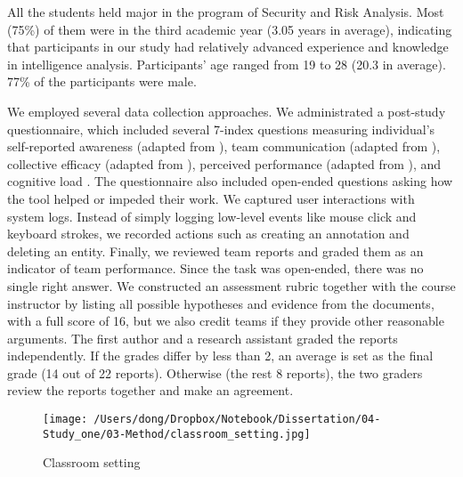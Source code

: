 All the students held major in the program of Security and Risk
Analysis. Most (75\%) of them were in the third academic year (3.05
years in average), indicating that participants in our study had
relatively advanced experience and knowledge in intelligence analysis.
Participants' age ranged from 19 to 28 (20.3 in average). 77\% of the
participants were male.

We employed several data collection approaches. We administrated a
post-study questionnaire, which included several 7-index questions
measuring individual's self-reported awareness (adapted from
\autocite{Convertino2011}), team communication (adapted from
\autocite{Convertino2011}), collective efficacy (adapted from
\autocite{Convertino2011}), perceived performance (adapted from
\autocite{Goyal2014}), and cognitive load \autocite{Hart1988}. The
questionnaire also included open-ended questions asking how the tool
helped or impeded their work. We captured user interactions with system
logs. Instead of simply logging low-level events like mouse click and
keyboard strokes, we recorded actions such as creating an annotation and
deleting an entity. Finally, we reviewed team reports and graded them as
an indicator of team performance. Since the task was open-ended, there
was no single right answer. We constructed an assessment rubric together
with the course instructor by listing all possible hypotheses and
evidence from the documents, with a full score of 16, but we also credit
teams if they provide other reasonable arguments. The first author and a
research assistant graded the reports independently. If the grades
differ by less than 2, an average is set as the final grade (14 out of
22 reports). Otherwise (the rest 8 reports), the two graders review the
reports together and make an agreement.

\begin{figure}
\centering
\texttt{[image: /Users/dong/Dropbox/Notebook/Dissertation/04-Study\_one/03-Method/classroom\_setting.jpg]}
\caption{Classroom setting}\label{fig:classroom}
\end{figure}
